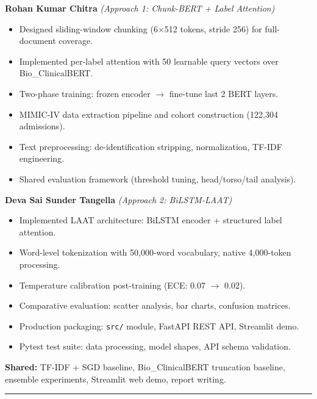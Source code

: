 \documentclass[11pt,a4paper]{article}
\begin{document}
\begin{minipage}[t]{0.48\textwidth}
\textbf{Rohan Kumar Chitra} \textit{(Approach 1: Chunk-BERT + Label Attention)}
\begin{itemize}[nosep,leftmargin=1.2em]
    \item Designed sliding-window chunking (6$\times$512 tokens, stride 256) for full-document coverage.
    \item Implemented per-label attention with 50 learnable query vectors over Bio\_ClinicalBERT.
    \item Two-phase training: frozen encoder $\rightarrow$ fine-tune last 2 BERT layers.
    \item MIMIC-IV data extraction pipeline and cohort construction (122,304 admissions).
    \item Text preprocessing: de-identification stripping, normalization, TF-IDF engineering.
    \item Shared evaluation framework (threshold tuning, head/torso/tail analysis).
\end{itemize}
\end{minipage}
\hfill
\begin{minipage}[t]{0.48\textwidth}
\textbf{Deva Sai Sunder Tangella} \textit{(Approach 2: BiLSTM-LAAT)}
\begin{itemize}[nosep,leftmargin=1.2em]
    \item Implemented LAAT architecture: BiLSTM encoder + structured label attention.
    \item Word-level tokenization with 50,000-word vocabulary, native 4,000-token processing.
    \item Temperature calibration post-training (ECE: 0.07 $\rightarrow$ 0.02).
    \item Comparative evaluation: scatter analysis, bar charts, confusion matrices.
    \item Production packaging: \texttt{src/} module, FastAPI REST API, Streamlit demo.
    \item Pytest test suite: data processing, model shapes, API schema validation.
\end{itemize}
\end{minipage}

\smallskip
\noindent\textbf{Shared:} TF-IDF + SGD baseline, Bio\_ClinicalBERT truncation baseline, ensemble experiments, Streamlit web demo, report writing.

\vspace{6pt}
\noindent\rule{\textwidth}{1.0pt}
\vspace{6pt}
\end{document}
